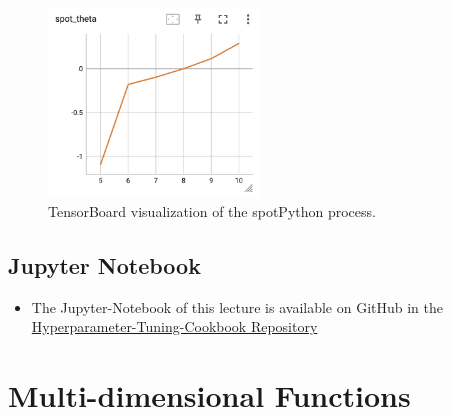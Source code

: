 \documentclass[
  letterpaper,
  DIV=11,
  numbers=noendperiod]{scrreprt}
\providecommand{\tightlist}{%
  \setlength{\itemsep}{0pt}\setlength{\parskip}{0pt}}\usepackage{longtable,booktabs,array}
\begin{document}
\begin{figure}[H]

{\centering \includegraphics[width=0.5\textwidth,height=\textheight]{figures_static/01_tensorboard_03.png}

}

\caption{TensorBoard visualization of the spotPython process.}

\end{figure}%

\section{Jupyter Notebook}\label{jupyter-notebook-6}

\begin{tcolorbox}[enhanced jigsaw, left=2mm, opacitybacktitle=0.6, leftrule=.75mm, toptitle=1mm, opacityback=0, colback=white, rightrule=.15mm, colframe=quarto-callout-note-color-frame, title=\textcolor{quarto-callout-note-color}{\faInfo}\hspace{0.5em}{Note}, toprule=.15mm, coltitle=black, bottomrule=.15mm, bottomtitle=1mm, colbacktitle=quarto-callout-note-color!10!white, titlerule=0mm, breakable, arc=.35mm]

\begin{itemize}
\tightlist
\item
  The Jupyter-Notebook of this lecture is available on GitHub in the
  \href{https://github.com/sequential-parameter-optimization/Hyperparameter-Tuning-Cookbook/blob/main/007_num_spot_intro.ipynb}{Hyperparameter-Tuning-Cookbook
  Repository}
\end{itemize}

\end{tcolorbox}

\chapter{Multi-dimensional Functions}\label{sec-multi-dim}
\end{document}
